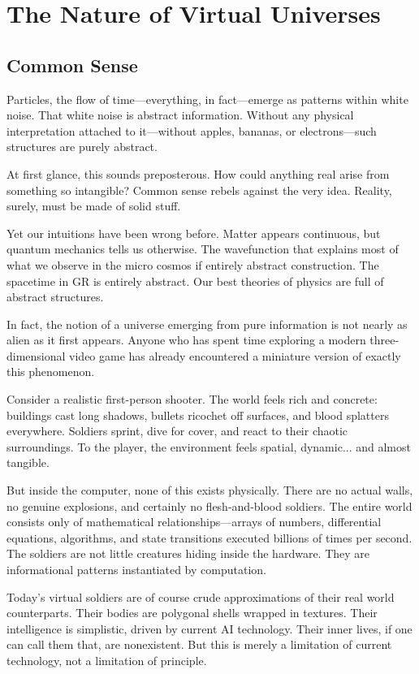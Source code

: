 \chapter{The Nature of Virtual Universes}
\label{chap:nature-of-virtual-universes}

\section{Common Sense}
  
Particles, the flow of time—everything, in fact—emerge as patterns within white noise.
That white noise is abstract information.
Without any physical interpretation attached to it—without apples, bananas, or electrons—such structures are purely abstract.

At first glance, this sounds preposterous. How could anything real arise from something so intangible? Common sense rebels against the very idea.
Reality, surely, must be made of solid stuff.

Yet our intuitions have been wrong before. Matter appears continuous, but quantum mechanics tells us otherwise. The wavefunction
that explains most of what we observe in the micro cosmos if entirely abstract construction. The spacetime in GR is entirely abstract.
Our best theories of physics are full of abstract structures.

In fact, the notion of a universe emerging from pure information is not nearly as alien as it first appears.
Anyone who has spent time exploring a modern three-dimensional video game has already encountered a miniature version of exactly this phenomenon.

Consider a realistic first-person shooter.
The world feels rich and concrete: buildings cast long shadows, bullets ricochet off surfaces, and blood splatters everywhere.
Soldiers sprint, dive for cover, and react to their chaotic surroundings.
To the player, the environment feels spatial, dynamic... and almost tangible.

But inside the computer, none of this exists physically.
There are no actual walls, no genuine explosions, and certainly no flesh-and-blood soldiers.
The entire world consists only of mathematical relationships—arrays of numbers, differential equations, algorithms, and state transitions executed billions of times per second.
The soldiers are not little creatures hiding inside the hardware. They are informational patterns instantiated by computation.

Today's virtual soldiers are of course crude approximations of their real world counterparts.
Their bodies are polygonal shells wrapped in textures. Their intelligence is simplistic, driven by current AI technology.
Their inner lives, if one can call them that, are nonexistent. But this is merely a limitation of current technology, not a limitation of principle.

